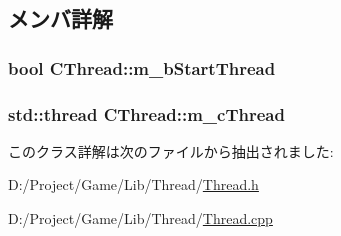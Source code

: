 \subsection{メンバ詳解}
\hypertarget{class_c_thread_a6c06ca19f97664620c40a1807f99159f}{}
\subsubsection[{m\+\_\+b\+Start\+Thread}]{\setlength{\rightskip}{0pt plus 5cm}bool C\+Thread\+::m\+\_\+b\+Start\+Thread\hspace{0.3cm}{\ttfamily [private]}}\label{class_c_thread_a6c06ca19f97664620c40a1807f99159f}
\hypertarget{class_c_thread_ae9a1eb632950ffb7a12228ab7c8b9ade}{}
\subsubsection[{m\+\_\+c\+Thread}]{\setlength{\rightskip}{0pt plus 5cm}std\+::thread C\+Thread\+::m\+\_\+c\+Thread\hspace{0.3cm}{\ttfamily [private]}}\label{class_c_thread_ae9a1eb632950ffb7a12228ab7c8b9ade}


このクラス詳解は次のファイルから抽出されました\+:\begin{DoxyCompactItemize}
\item 
D\+:/\+Project/\+Game/\+Lib/\+Thread/\hyperlink{_thread_8h}{Thread.\+h}\item 
D\+:/\+Project/\+Game/\+Lib/\+Thread/\hyperlink{_thread_8cpp}{Thread.\+cpp}\end{DoxyCompactItemize}
